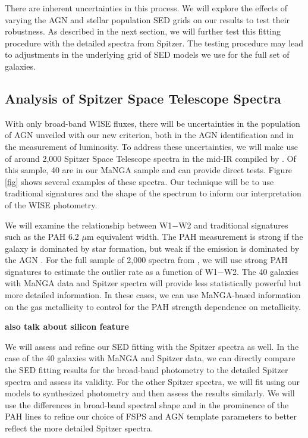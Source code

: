 \documentclass[12pt, preprint]{hacked-aastex}
\begin{document}
There are inherent uncertainties in this process. We will explore the
effects of varying the AGN and stellar population SED grids on our
results to test their robustness.  As described in the next section,
we will further test this fitting procedure with the detailed spectra
from Spitzer. The testing procedure may lead to adjustments in the
underlying grid of SED models we use for the full set of galaxies.


\subsection{Analysis of Spitzer Space Telescope Spectra}
\label{sec:spitzer}

With only broad-band WISE fluxes, there will be uncertainties in the
population of AGN unveiled with our new criterion, both in the AGN
identification and in the measurement of luminosity. To address these
uncertainties, we will make use of around 2,000 Spitzer Space
Telescope spectra in the mid-IR compiled by \cite{lambrides}. Of this
sample, 40 are in our MaNGA sample and can provide direct tests.
Figure \ref{fig} shows several examples of these spectra.  Our
technique will be to use traditional signatures and the shape of the
spectrum to inform our interpretation of the WISE photometry.

We will examine the relationship between W1$-$W2 and traditional
signatures such as the PAH 6.2 $\mu$m equivalent width. The PAH
measurement is strong if the galaxy is dominated by star formation,
but weak if the emission is dominated by the AGN \cite{sajina22a}.
For the full sample of 2,000 spectra from \cite{lambrides}, we will
use strong PAH signatures to estimate the outlier rate as a function
of W1$-$W2.  The 40 galaxies with MaNGA data and Spitzer spectra will
provide less statistically powerful but more detailed information. In
these cases, we can use MaNGA-based information on the gas metallicity
to control for the PAH strength dependence on metallicity.

{\bf also talk about silicon feature}

We will assess and refine our SED fitting with the Spitzer spectra as
well.  In the case of the 40 galaxies with MaNGA and Spitzer data, we
can directly compare the SED fitting results for the broad-band
photometry to the detailed Spitzer spectra and assess its
validity. For the other Spitzer spectra, we will fit using our models
to synthesized photometry and then assess the results similarly. We
will use the differences in broad-band spectral shape and in the
prominence of the PAH lines to refine our choice of FSPS and AGN
template parameters to better reflect the more detailed Spitzer
spectra.
\end{document}
